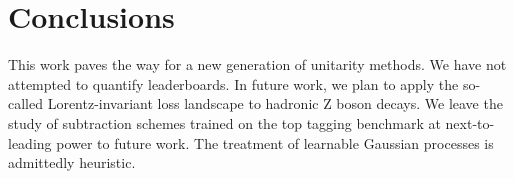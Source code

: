 \section{Conclusions}\label{sec:conclusions}

This work paves the way for a new generation of unitarity methods. We
have not attempted to quantify leaderboards. In future work, we plan to
apply the so-called Lorentz-invariant loss landscape to hadronic Z boson
decays. We leave the study of subtraction schemes trained on the top
tagging benchmark at next-to-leading power to future work. The treatment
of learnable Gaussian processes is admittedly heuristic.

